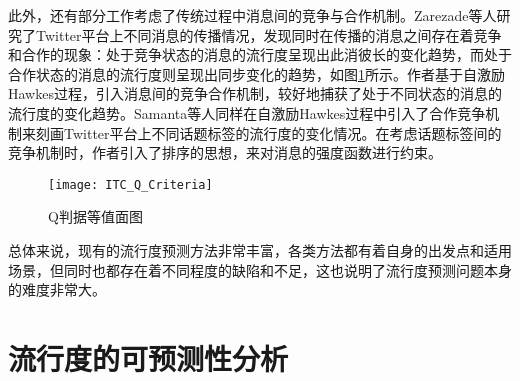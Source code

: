 此外，还有部分工作考虑了传统过程中消息间的竞争与合作机制。Zarezade等人\citep{zarezade2017correlated}研究了Twitter平台上不同消息的传播情况，发现同时在传播的消息之间存在着竞争和合作的现象：处于竞争状态的消息的流行度呈现出此消彼长的变化趋势，而处于合作状态的消息的流行度则呈现出同步变化的趋势，如图\ref{fig:cooperate}所示。作者基于自激励Hawkes过程，引入消息间的竞争合作机制，较好地捕获了处于不同状态的消息的流行度的变化趋势。Samanta等人\citep{samantalmpp}同样在自激励Hawkes过程中引入了合作竞争机制来刻画Twitter平台上不同话题标签的流行度的变化情况。在考虑话题标签间的竞争机制时，作者引入了排序的思想，来对消息的强度函数进行约束。
\begin{figure}[!htbp]
  \centering
  \texttt{[image: ITC\_Q\_Criteria]}
  \caption{Q判据等值面图}
  \label{fig:cooperate}
\end{figure}

总体来说，现有的流行度预测方法非常丰富，各类方法都有着自身的出发点和适用场景，但同时也都存在着不同程度的缺陷和不足，这也说明了流行度预测问题本身的难度非常大。

\section{流行度的可预测性分析}

